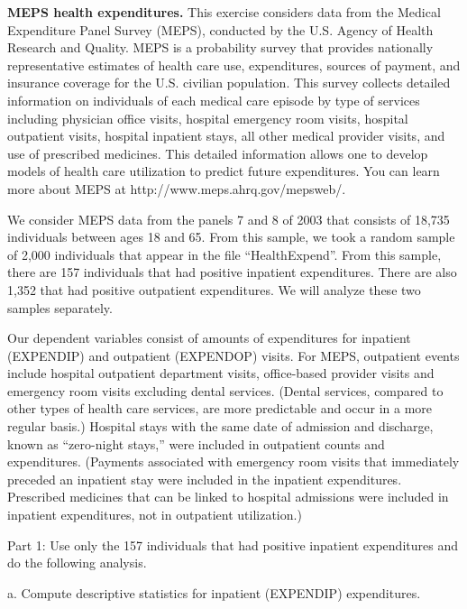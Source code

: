 \begin{exercises}

\item \textbf{MEPS health expenditures.}\label{Ex:MedExpend} This exercise considers data
from the Medical Expenditure Panel Survey (MEPS), conducted by the
U.S. Agency of Health Research and Quality. MEPS is a probability
survey that provides nationally representative estimates of health
care use, expenditures, sources of payment, and insurance coverage
for the U.S. civilian population. This survey collects detailed
information on individuals of each medical care episode by type of
services including physician office visits, hospital emergency room
visits, hospital outpatient visits, hospital inpatient stays, all
other medical provider visits, and use of prescribed medicines. This
detailed information allows one to develop models of health care
utilization to predict future expenditures. You can learn more about
MEPS at http://www.meps.ahrq.gov/mepsweb/.

We consider MEPS data from the panels 7 and 8 of 2003 that consists
of 18,735 individuals between ages 18 and 65. From this sample, we
took a random sample of 2,000 individuals that appear in the file
``HealthExpend''. From this sample, there are 157 individuals that
had positive inpatient expenditures. There are also 1,352 that had
positive outpatient expenditures. We will analyze these two samples
separately.

Our dependent variables consist of amounts of expenditures for
inpatient (EXPENDIP) and outpatient (EXPENDOP) visits. For MEPS,
outpatient events include hospital outpatient department visits,
office-based provider visits and emergency room visits excluding
dental services. (Dental services, compared to other types of health
care services, are more predictable and occur in a more regular
basis.) Hospital stays with the same date of admission and
discharge, known as ``zero-night stays,'' were included in
outpatient counts and expenditures. (Payments associated with
emergency room visits that immediately preceded an inpatient stay
were included in the inpatient expenditures. Prescribed medicines
that can be linked to hospital admissions were included in inpatient
expenditures, not in outpatient utilization.)

Part 1: Use only the 157 individuals that had positive inpatient
expenditures and do the following analysis.

a. Compute descriptive statistics for inpatient (EXPENDIP)
expenditures.


\end{exercises}
